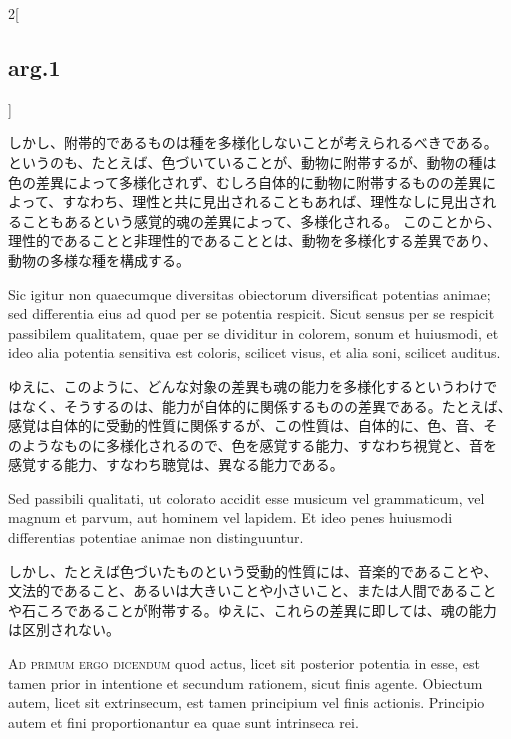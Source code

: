 \documentclass[paper=a4paper,fontsize=10pt,jafontsize=9pt,titlepage]{jlreq}
\begin{document}
\begin{paracol}{2}[\subsection{arg.1}]
\switchcolumn

しかし、附帯的であるものは種を多様化しないことが考えられるべきである。
というのも、たとえば、色づいていることが、動物に附帯するが、動物の種は
色の差異によって多様化されず、むしろ自体的に動物に附帯するものの差異に
よって、すなわち、理性と共に見出されることもあれば、理性なしに見出され
ることもあるという感覚的魂の差異によって、多様化される。 このことから、
理性的であることと非理性的であることとは、動物を多様化する差異であり、
動物の多様な種を構成する。


\switchcolumn*

 Sic igitur non quaecumque diversitas obiectorum diversificat
 potentias animae; sed differentia eius ad quod per se potentia
 respicit. Sicut sensus per se respicit passibilem qualitatem, quae
 per se dividitur in colorem, sonum et huiusmodi, et ideo alia
 potentia sensitiva est coloris, scilicet visus, et alia soni,
 scilicet auditus.
 
\switchcolumn

ゆえに、このように、どんな対象の差異も魂の能力を多様化するというわけで
はなく、そうするのは、能力が自体的に関係するものの差異である。たとえば、
感覚は自体的に受動的性質に関係するが、この性質は、自体的に、色、音、そ
のようなものに多様化されるので、色を感覚する能力、すなわち視覚と、音を
感覚する能力、すなわち聴覚は、異なる能力である。

\switchcolumn*

 Sed passibili qualitati, ut colorato accidit esse musicum vel
 grammaticum, vel magnum et parvum, aut hominem vel lapidem. Et ideo
 penes huiusmodi differentias potentiae animae non distinguuntur.

 
\switchcolumn

しかし、たとえば色づいたものという受動的性質には、音楽的であることや、
文法的であること、あるいは大きいことや小さいこと、または人間であること
や石ころであることが附帯する。ゆえに、これらの差異に即しては、魂の能力
 は区別されない。
 

\switchcolumn*[\subsection{ad 1}]

 {\scshape Ad primum ergo dicendum} quod actus, licet sit posterior
 potentia in esse, est tamen prior in intentione et secundum rationem,
 sicut finis agente. Obiectum autem, licet sit extrinsecum, est tamen
 principium vel finis actionis. Principio autem et fini
 proportionantur ea quae sunt intrinseca rei.


\end{paracol}
\end{document}
